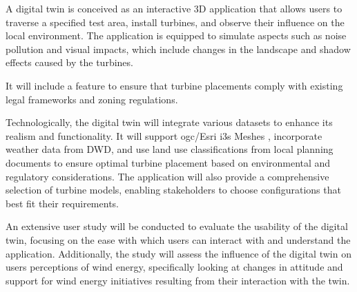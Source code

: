 \documentclass[11pt, titlepage, a4paper]{scrartcl}
\begin{document}
\begin{linenumbers}
    A digital twin is conceived as an interactive 3D application that allows users to traverse a specified test area, install turbines, and observe their influence on the local environment. The application is equipped to simulate aspects such as noise pollution and visual impacts, which include changes in the landscape and shadow effects caused by the turbines.

    It will include a feature to ensure that turbine placements comply with existing legal frameworks and zoning regulations.

    Technologically, the digital twin will integrate various datasets to enhance its realism and functionality. It will support \gls{ogc}/Esri \gls{i3s} Meshes \cite{esriincI3sspec}, incorporate weather data from DWD, and use land use classifications from local planning documents %
    to ensure optimal turbine placement based on environmental and regulatory considerations. The application will also provide a comprehensive selection of turbine models, enabling stakeholders to choose configurations that best fit their requirements.

    An extensive user study will be conducted to evaluate the usability of the digital twin, focusing on the ease with which users can interact with and understand the application. Additionally, the study will assess the influence of the digital twin on users perceptions of wind energy, specifically looking at changes in attitude and support for wind energy initiatives resulting from their interaction with the twin.






\end{linenumbers}
\end{document}
